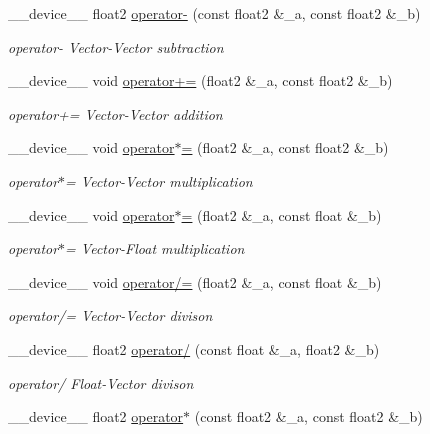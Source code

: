 \begin{DoxyCompactItemize}
\-\_\-\-\_\-device\-\_\-\-\_\- float2 \hyperlink{MathHelpers_8cuh_a679e7ae0603882bbc3410dedfa37ed52}{operator-\/} (const float2 \&\-\_\-a, const float2 \&\-\_\-b)
\begin{DoxyCompactList}\small\item\em operator-\/ Vector-\/\-Vector subtraction \end{DoxyCompactList}\item 
\-\_\-\-\_\-device\-\_\-\-\_\- void \hyperlink{MathHelpers_8cuh_ac99554ab5f9a33bda703e865f7843f62}{operator+=} (float2 \&\-\_\-a, const float2 \&\-\_\-b)
\begin{DoxyCompactList}\small\item\em operator+= Vector-\/\-Vector addition \end{DoxyCompactList}\item 
\-\_\-\-\_\-device\-\_\-\-\_\- void \hyperlink{MathHelpers_8cuh_afaff943e572e0afdb79e12072d04603b}{operator$\ast$=} (float2 \&\-\_\-a, const float2 \&\-\_\-b)
\begin{DoxyCompactList}\small\item\em operator$\ast$= Vector-\/\-Vector multiplication \end{DoxyCompactList}\item 
\-\_\-\-\_\-device\-\_\-\-\_\- void \hyperlink{MathHelpers_8cuh_af0cf6e6b14ba2dc47b261f4706e9930a}{operator$\ast$=} (float2 \&\-\_\-a, const float \&\-\_\-b)
\begin{DoxyCompactList}\small\item\em operator$\ast$= Vector-\/\-Float multiplication \end{DoxyCompactList}\item 
\-\_\-\-\_\-device\-\_\-\-\_\- void \hyperlink{MathHelpers_8cuh_adf398ce3423b85758d94a34cafc99c9a}{operator/=} (float2 \&\-\_\-a, const float \&\-\_\-b)
\begin{DoxyCompactList}\small\item\em operator/= Vector-\/\-Vector divison \end{DoxyCompactList}\item 
\-\_\-\-\_\-device\-\_\-\-\_\- float2 \hyperlink{MathHelpers_8cuh_af24dd0cf2f2fb216ba4187fdae04e520}{operator/} (const float \&\-\_\-a, float2 \&\-\_\-b)
\begin{DoxyCompactList}\small\item\em operator/ Float-\/\-Vector divison \end{DoxyCompactList}\item 
\-\_\-\-\_\-device\-\_\-\-\_\- float2 \hyperlink{MathHelpers_8cuh_a8b844332829230fc87333cd82cbb6a03}{operator$\ast$} (const float2 \&\-\_\-a, const float2 \&\-\_\-b)

\end{DoxyCompactItemize}

